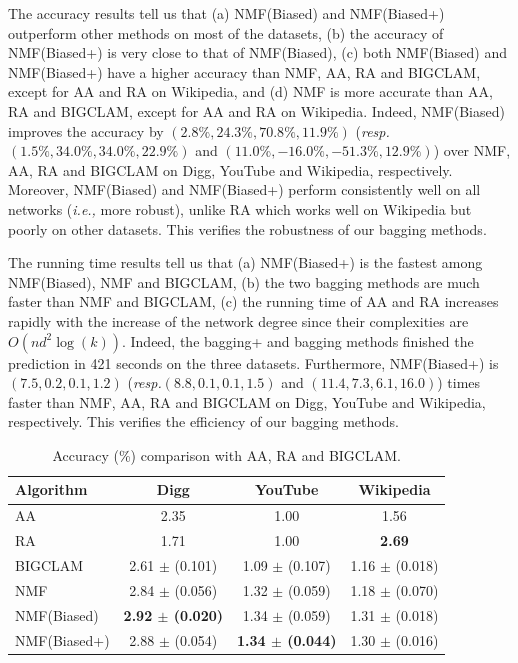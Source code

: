\documentclass[10pt,journal,compsoc]{IEEEtran}
\newcommand{\NMF}{{\sf NMF}\xspace }
\newcommand{\Biased}{{\sf NMF(Biased)}\xspace}
\newcommand{\Aa}{{\sf AA}\xspace }
\newcommand{\RA}{{\sf RA}\xspace }
\newcommand{\BIGCLAM}{{\sf BIGCLAM}\xspace}
\newcommand{\Digg}{{\sf Digg}\xspace}
\newcommand{\YouTube}{{\sf YouTube}\xspace}
\newcommand{\Wikipedia}{{\sf Wikipedia}\xspace}
\newcommand{\Biasedp}{{\sf NMF(Biased+)}\xspace}
\newcommand{\ie}{\emph{i.e.,}\xspace}
\newcommand{\resp}{\emph{resp.}\xspace}
\begin{document}
The accuracy results tell us that (a) \Biased and \Biasedp outperform other methods on
most of the datasets, (b) the accuracy of \Biasedp is very close to that of \Biased, (c) both
\Biased and \Biasedp have a higher accuracy than \NMF, \Aa, \RA and \BIGCLAM, except for \Aa and \RA on \Wikipedia,
and (d) \NMF is more accurate than \Aa, \RA and \BIGCLAM, except for \Aa and \RA on \Wikipedia.
Indeed, \Biased improves the accuracy by $(2.8\%, 24.3\%, 70.8\%, 11.9\%)$ (\resp $(1.5\%, 34.0\%, 34.0\%, 22.9\%)$
and $(11.0\%, -16.0\%, -51.3\%, 12.9\%)$) over \NMF, \Aa, \RA and \BIGCLAM on \Digg, \YouTube and \Wikipedia,
respectively. Moreover, \Biased and \Biasedp perform consistently well on all networks (\ie more robust), unlike \RA which works well
on \Wikipedia but poorly on other datasets. This verifies the robustness of our bagging methods.


The running time results tell us that (a) \Biasedp is the fastest among 
\Biased, \NMF and \BIGCLAM, (b) the two bagging methods are much faster than \NMF and \BIGCLAM,
(c) the running time of \Aa and \RA increases rapidly with the increase of the network degree 
 since their complexities are $O(nd^2\log(k))$.
Indeed, the bagging+ and bagging methods finished the prediction in 421 seconds on the three datasets.
Furthermore, \Biasedp is $(7.5, 0.2, 0.1, 1.2)$ (\resp $(8.8, 0.1, 0.1, 1.5)$ and $(11.4, 7.3, 6.1, 16.0)$)
times faster than \NMF, \Aa, \RA and \BIGCLAM on
\Digg, \YouTube and \Wikipedia, respectively.
This verifies the efficiency of our bagging methods.

\begin{table}
\caption{Accuracy (\%) comparison with \Aa, \RA and \BIGCLAM.}
\label{tab_accuracy}
\vspace{-2ex}
\centering
\newcommand{\tabincell}[2]{\begin{tabular}{@{}#1@{}}#2\end{tabular}}
\begin{tabular}{l|c|c|c}
\hline \hline Algorithm  & Digg & YouTube & Wikipedia  \\
\hline \hline
\Aa & 2.35 &	1.00 &	1.56  \\
\RA & 1.71 &	1.00 &	\textbf{2.69}  \\
\BIGCLAM & 2.61 $\pm$ (0.101) &	1.09 $\pm$ (0.107) &	1.16 $\pm$ (0.018)  \\
\NMF & 2.84 $\pm$ (0.056)	& 1.32 $\pm$ (0.059) 	& 1.18 $\pm$ (0.070) \\
\Biased & \textbf{2.92 $\pm$ (0.020)}	& 1.34 $\pm$ (0.059)	& 1.31 $\pm$ (0.018)\\
\Biasedp & 2.88 $\pm$ (0.054)	& \textbf{1.34 $\pm$ (0.044)}	& 1.30 $\pm$ (0.016) \\
\hline \hline
\end{tabular}
\vspace{-2ex}
\end{table}
\end{document}
